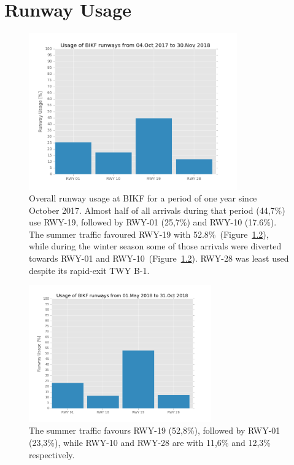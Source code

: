 


\chapter{Runway Usage}\label{app:RWY_usage}


\begin{figure}[h]
    \centering
    \includegraphics[width=0.8\textwidth]{graphics/fig_runway_usage_2017-10-04_to_2018-11-30.png}
    \caption[Runway usage at BIKF]{Overall runway usage at BIKF for a period of one year since October 2017. Almost half of all arrivals during that period (44,7\%) use RWY-19, followed by RWY-01 (25,7\%) and RWY-10 (17.6\%). The summer traffic favoured RWY-19 with 52.8\%~(Figure~\ref{fig:runway_usage_summer}), while during the winter season some of those arrivals were diverted towards RWY-01 and RWY-10~(Figure~\ref{fig:runway_usage_summer}). RWY-28 was least used despite its rapid-exit TWY B-1.}
    \label{fig:runway_usage}
\end{figure}

\begin{figure}[h]
    \centering
    \includegraphics[width=0.7\textwidth]{graphics/fig_runway_usage_summer}
    \caption[Summer runway usage at BIKF]{The summer traffic favours RWY-19 (52,8\%), followed by RWY-01 (23,3\%), while RWY-10 and RWY-28 are with 11,6\% and 12,3\% respectively.}
    \label{fig:runway_usage_summer}
\end{figure}

